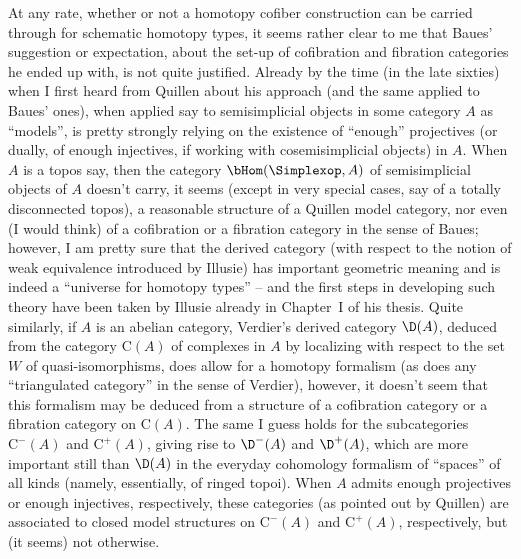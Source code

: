 At any rate, whether or not a homotopy cofiber construction can be
carried through for schematic homotopy types, it seems rather clear to
me that Baues' suggestion or expectation, about the set-up of
cofibration and fibration categories he ended up with, is not quite
justified. Already by the time (in the late sixties) when I first
heard from Quillen about his approach (and the same applied to Baues'
ones), when applied say to semisimplicial objects in some category $A$
as ``models'', is pretty strongly relying on the existence of
``enough'' projectives (or dually, of enough injectives, if working
with cosemisimplicial objects) in $A$. When $A$ is a topos say, then
the category $\bHom(\Simplexop,A)$ of semisimplicial objects of $A$
doesn't carry, it seems (except in very special cases, say of a
totally disconnected topos), a reasonable structure of a Quillen model
category, nor even (I would think) of a cofibration or a fibration
category in the sense of Baues; however, I am pretty sure that the
derived category (with respect to the notion of weak equivalence
introduced by Illusie) has
important geometric meaning and is indeed a ``universe for homotopy
types'' -- and the first steps in developing such theory have been
taken by Illusie already in Chapter~I of his thesis. Quite similarly,
if $A$ is an abelian category, Verdier's derived category $\D(A)$,
deduced from the category $\mathrm C(A)$ of complexes in $A$ by
localizing with respect to the set $W$ of quasi-isomorphisms, does
allow for a homotopy formalism (as does any ``triangulated category''
in the sense of Verdier), however, it doesn't seem that this formalism
may be deduced from a structure of a cofibration category or a
fibration category on $\mathrm C(A)$. The same I guess holds for the
subcategories $\mathrm C^-(A)$ and $\mathrm C^+(A)$, giving rise to
$\D^-(A)$ and $\D^+(A)$, which are more important still than $\D(A)$
in the everyday cohomology formalism of ``spaces'' of all kinds
(namely, essentially, of ringed topoi). When $A$ admits
enough projectives or enough injectives, respectively, these
categories (as pointed out by Quillen) are associated to closed model
structures on $\mathrm C^-(A)$ and $\mathrm C^+(A)$, respectively, but
(it seems) not otherwise.

